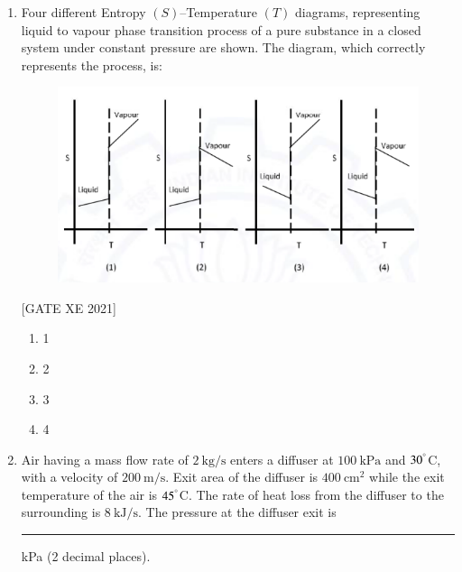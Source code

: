 \documentclass[journal,12pt,onecolumn]{IEEEtran}
\theoremstyle{remark}
\begin{document}
\begin{enumerate}[resume]
\hfill[GATE XE 2021]

\begin{multicols}{2}
\begin{enumerate}
    \item $g_{v,A} > g_{l,B}$
    \item $g_{v,A} < g_{l,B}$
    \item $g_{v,A} = g_{l,B}$
    \item $g_{l,B} = 2 g_{l,A}$
\end{enumerate}
\end{multicols}

\item Four different Entropy $(S)$–Temperature $(T)$ diagrams, representing liquid to vapour phase transition process of a pure substance in a closed system under constant pressure are shown. The diagram, which correctly represents the process, is:

\begin{figure}[H]
      \centering
      \includegraphics[width=0.5\columnwidth]{figs/fig32.png}
      \caption{}
      \label{fig:placeholder}
  \end{figure}

\hfill[GATE XE 2021]

\begin{multicols}{4}
\begin{enumerate}
\item 1
\item 2
\item 3
\item 4
\end{enumerate}
\end{multicols}

\item Air having a mass flow rate of $2\ \text{kg/s}$ enters a diffuser at $100\ \text{kPa}$ and $30^\degree$C, with a velocity of $200\ \text{m/s}$. Exit area of the diffuser is $400\ \text{cm}^2$ while the exit temperature of the air is $45^\degree$C. The rate of heat loss from the diffuser to the surrounding is $8\ \text{kJ/s}$. The pressure at the diffuser exit is \rule{3cm}{0.15mm} kPa (2 decimal places).  


\end{enumerate}
\end{document}
